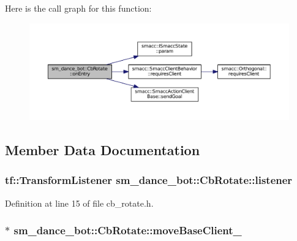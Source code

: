 Here is the call graph for this function\+:
\nopagebreak
\begin{figure}[H]
\begin{center}
\leavevmode
\includegraphics[width=350pt]{classsm__dance__bot_1_1CbRotate_ad4e05a82d567baea5e373b7eec187760_cgraph}
\end{center}
\end{figure}




\subsection{Member Data Documentation}
\subsubsection[{\texorpdfstring{listener}{listener}}]{\setlength{\rightskip}{0pt plus 5cm}tf\+::\+Transform\+Listener sm\+\_\+dance\+\_\+bot\+::\+Cb\+Rotate\+::listener}\hypertarget{classsm__dance__bot_1_1CbRotate_a40f03a928591fed26f84a35be9ddc741}{}\label{classsm__dance__bot_1_1CbRotate_a40f03a928591fed26f84a35be9ddc741}


Definition at line 15 of file cb\+\_\+rotate.\+h.

\subsubsection[{\texorpdfstring{move\+Base\+Client\+\_\+}{moveBaseClient_}}]{$\ast$ sm\+\_\+dance\+\_\+bot\+::\+Cb\+Rotate\+::move\+Base\+Client\+\_\+}\hypertarget{classsm__dance__bot_1_1CbRotate_acbdfc540d60c0cdb3a1e592bede8b5c5}{}\label{classsm__dance__bot_1_1CbRotate_acbdfc540d60c0cdb3a1e592bede8b5c5}


